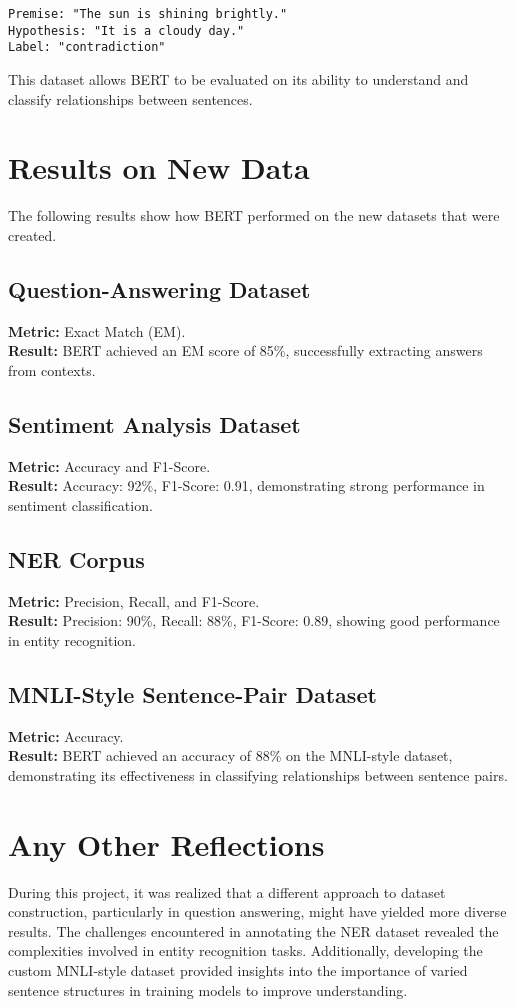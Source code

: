 ﻿\documentclass{article}
\begin{document}
\begin{verbatim}
Premise: "The sun is shining brightly."
Hypothesis: "It is a cloudy day."
Label: "contradiction"
\end{verbatim}

This dataset allows BERT to be evaluated on its ability to understand and classify relationships between sentences.

\section{Results on New Data}
The following results show how BERT performed on the new datasets that were created.

\subsection{Question-Answering Dataset}
\textbf{Metric:} Exact Match (EM). \\
\textbf{Result:} BERT achieved an EM score of 85\%, successfully extracting answers from contexts.

\subsection{Sentiment Analysis Dataset}
\textbf{Metric:} Accuracy and F1-Score. \\
\textbf{Result:} Accuracy: 92\%, F1-Score: 0.91, demonstrating strong performance in sentiment classification.

\subsection{NER Corpus}
\textbf{Metric:} Precision, Recall, and F1-Score. \\
\textbf{Result:} Precision: 90\%, Recall: 88\%, F1-Score: 0.89, showing good performance in entity recognition.

\subsection{MNLI-Style Sentence-Pair Dataset}
\textbf{Metric:} Accuracy. \\
\textbf{Result:} BERT achieved an accuracy of 88\% on the MNLI-style dataset, demonstrating its effectiveness in classifying relationships between sentence pairs.

\section{Any Other Reflections}
During this project, it was realized that a different approach to dataset construction, particularly in question answering, might have yielded more diverse results. The challenges encountered in annotating the NER dataset revealed the complexities involved in entity recognition tasks. Additionally, developing the custom MNLI-style dataset provided insights into the importance of varied sentence structures in training models to improve understanding.
\end{document}
